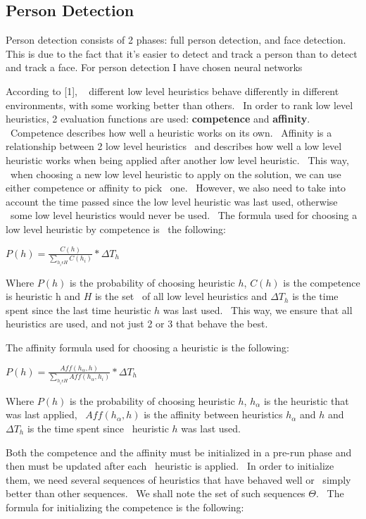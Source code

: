 \subsection{Person Detection}
\label{subsec:person-detection}
Person detection consists of 2 phases: full person detection, and face detection. %
This is due to the fact that it's easier to detect and track a person than to detect and track a face.
For person detection I have chosen neural networks


 According to [1], \ %
different low level heuristics behave differently in different environments, with some working better than others. \
In order to rank low level heuristics, 2 evaluation functions are used: \textbf{competence} and \textbf{affinity}. \
Competence describes how well a heuristic works on its own. \
Affinity is a relationship between 2 low level heuristics \
and describes how well a low level heuristic works when being applied after another low level heuristic. \
This way, \
when choosing a new low level heuristic to apply on the solution, we can use either competence or affinity to pick \
one. \
However, we also need to take into account the time passed since the low level heuristic was last used, otherwise \
some low level heuristics would never be used. \
The formula used for choosing a low level heuristic by competence is \
the following:

\( P(h) = \frac{C(h)}{\sum_{h_i \epsilon H} C(h_i)} * \Delta T_h \)

Where $P(h)$ is the probability of choosing heuristic $h$, $C(h)$ is the competence is heuristic h and $H$ is the set \
of all low level heuristics and $\Delta T_h$ is the time spent since the last time heuristic $h$ was last used. \
This way, we ensure that all heuristics are used, and not just 2 or 3 that behave the best.

The affinity formula used for choosing a heuristic is the following:

\( P(h) = \frac{Aff(h_\alpha, h)}{\sum_{h_i \epsilon H} Aff(h_\alpha , h_i)} * \Delta T_h \)

Where $P(h)$ is the probability of choosing heuristic $h$, $h_\alpha$ is the heuristic that was last applied, \
$Aff(h_\alpha , h)$ is the affinity between heuristics $h_\alpha$ and $h$ and $\Delta T_h$ is the time spent since \
heuristic $h$ was last used.

Both the competence and the affinity must be initialized in a pre-run phase and then must be updated after each \
heuristic is applied. \
In order to initialize them, we need several sequences of heuristics that have behaved well or \
simply better than other sequences. \
We shall note the set of such sequences $\Theta$. \
The formula for initializing the competence is the following:

